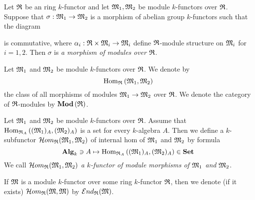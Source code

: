 \begin{definition}
Let ${\mathfrak R}$ be an ring $k$-functor and let ${\mathfrak M}_1,{\mathfrak M}_2$ be module $k$-functors over ${\mathfrak R}$. Suppose that $\sigma:{\mathfrak M}_1\rightarrow {\mathfrak M}_2$ is a morphism of abelian group $k$-functors such that the diagram
\begin{center}
\end{center}
is commutative, where $\alpha_i:{\mathfrak R}\times {\mathfrak M}_i\rightarrow {\mathfrak M}_i$ define ${\mathfrak R}$-module structure on ${\mathfrak M}_i$ for $i=1,2$. Then $\sigma$ is \textit{a morphism of modules over ${\mathfrak R}$}.
\end{definition}
\noindent
Let ${\mathfrak M}_1$ and ${\mathfrak M}_2$ be module $k$-functors over ${\mathfrak R}$. We denote by
$$\mathrm{Hom}_{{\mathfrak R}}\left({\mathfrak M}_1,{\mathfrak M}_2\right)$$
the class of all morphisms of modules ${\mathfrak M}_1\rightarrow {\mathfrak M}_2$ over ${\mathfrak R}$. We denote the category of ${\mathfrak R}$-modules by $\mathbf{Mod}\left({\mathfrak R}\right)$.

\begin{definition}
Let ${\mathfrak M}_1$ and ${\mathfrak M}_2$ be module $k$-functors over ${\mathfrak R}$. Assume that $\mathrm{Hom}_{{\mathfrak R}_A}\left(({\mathfrak M}_1)_A,({\mathfrak M}_2)_A\right)$ is a set for every $k$-algebra $A$. Then we define a $k$-subfunctor ${\mathcal H}om_{{\mathfrak R}}({\mathfrak M}_1,{\mathfrak M}_2)$ of internal hom of ${\mathfrak M}_1$ and ${\mathfrak M}_2$ by formula
$$\mathbf{Alg}_k\ni A \mapsto \mathrm{Hom}_{{\mathfrak R}_A}\left(({\mathfrak M}_1)_A,({\mathfrak M}_2)_A\right) \in \mathbf{Set}$$
We call ${\mathcal H}om_{{\mathfrak R}}({\mathfrak M}_1,{\mathfrak M}_2)$ \textit{a $k$-functor of module morphisms of ${\mathfrak M}_1$ and ${\mathfrak M}_2$}.
\end{definition}
\noindent
If ${\mathfrak M}$ is a module $k$-functor over some ring $k$-functor ${\mathfrak R}$, then we denote (if it exists) ${\mathcal H}om_{{\mathfrak R}}({\mathfrak M},{\mathfrak M})$ by ${\mathcal E} nd_{{\mathfrak R}}({\mathfrak M})$.

